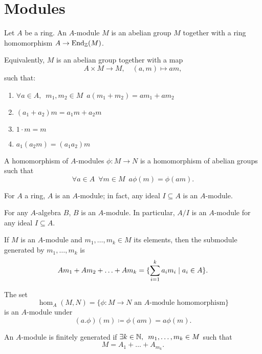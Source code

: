 \section{Modules}

\begin{df}
  Let $A$ be a ring. An $A$-module $M$ is an abelian group $M$ together with a ring homomorphism $A \to \operatorname*{End}_{\mathbb Z}(M)$.

Equivalently, $M$ is an abelian group together with a map
\[ A \times M \to M, \quad (a, m) \mapsto am, \]
such that:
\begin{enumerate}
\item $\forall a \in A, \enspace m_1, m_2 \in M \enspace a(m_1+m_2) = am_1 + am_2$
\item $(a_1 + a_2)m = a_1 m + a_2 m$
\item $1 \cdot m = m$
\item $a_1 (a_2 m) = (a_1 a_2) m$
\end{enumerate}
\end{df}

\begin{df}
  A homomorphism of $A$-modules $\phi \colon M \to N$ is a homomorphism of abelian groups such that
  \[ \forall a \in A \enspace \forall m \in M \enspace a \phi(m) = \phi(am). \]
\end{df}

\begin{example}
  For $A$ a ring, $A$ is an $A$-module; in fact, any ideal $I \subseteq A$ is an $A$-module.
\end{example}

\begin{example}
  For any $A$-algebra $B$, $B$ is an $A$-module. In particular, $A/{I}$ is an $A$-module for any ideal $I \subseteq A$.
\end{example}

\begin{df}
  If $M$ is an $A$-module and $m_1, \ldots, m_k \in M$ its elements, then the submodule generated by $m_1, \ldots, m_k$ is
  \[ Am_1 + Am_2 + \ldots + Am_k = \{ \sum_{i=1}^k a_i m_i \mathrel{|} a_i \in A \}.\]
\end{df}

\begin{prop}
  The set
  \[ \hom_A(M, N) = \{ \phi: M \to N \text{ an $A$-module homomorphism} \} \]
  is an $A$-module under
  \[ (a.\phi)(m) \coloneqq \phi(am) = a \phi(m).\]
\end{prop}

\begin{df}
  An $A$-module is finitely generated if
  $\exists k \in \mathbb N, \enspace m_1, \ldots, m_k \in M$
  such that
  \[M = A_1 + \ldots + A_{m_k}.\]
\end{df}

